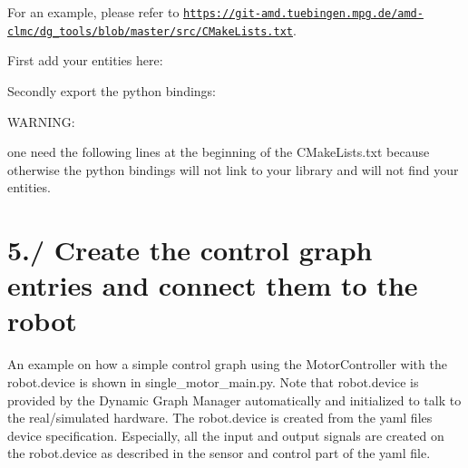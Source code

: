 For an example, please refer to \href{https://git-amd.tuebingen.mpg.de/amd-clmc/dg_tools/blob/master/src/CMakeLists.txt}{\tt https\+://git-\/amd.\+tuebingen.\+mpg.\+de/amd-\/clmc/dg\+\_\+tools/blob/master/src/\+C\+Make\+Lists.\+txt}.
\begin{DoxyItemize}
\item First add your entities here\+: 
\item Secondly export the python bindings\+: 
\end{DoxyItemize}


\begin{DoxyCode}
WARNING:

one need the following lines at the beginning of the CMakeLists.txt because 
otherwise the python bindings will not link to your library and will not find 
your entities.
\end{DoxyCode}
 \hypertarget{subpage_basic_control_graph_control_sec_load_graph}{}\section{5./ Create the control graph entries and connect them to the robot}\label{subpage_basic_control_graph_control_sec_load_graph}
An example on how a simple control graph using the Motor\+Controller with the robot.\+device is shown in single\+\_\+motor\+\_\+main.\+py. Note that {\ttfamily robot.\+device} is provided by the Dynamic Graph Manager automatically and initialized to talk to the real/simulated hardware. The robot.\+device is created from the yaml file\textquotesingle{}s device specification. Especially, all the input and output signals are created on the {\ttfamily robot.\+device} as described in the {\ttfamily sensor} and {\ttfamily control} part of the yaml file. 